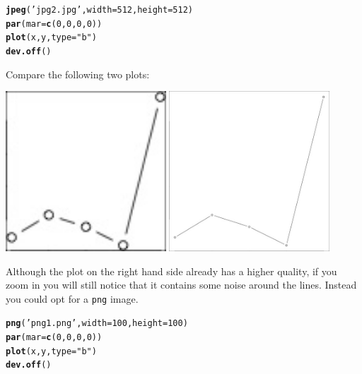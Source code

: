\documentclass{article}\usepackage[]{graphicx}\usepackage[]{color}
\makeatletter
\newcommand{\hlnum}[1]{\textcolor[rgb]{0.686,0.059,0.569}{#1}}%
\newcommand{\hlstr}[1]{\textcolor[rgb]{0.192,0.494,0.8}{#1}}%
\newcommand{\hlstd}[1]{\textcolor[rgb]{0.345,0.345,0.345}{#1}}%
\newcommand{\hlkwc}[1]{\textcolor[rgb]{0.333,0.667,0.333}{#1}}%
\newcommand{\hlkwd}[1]{\textcolor[rgb]{0.737,0.353,0.396}{\textbf{#1}}}%
\newenvironment{kframe}{%
 \def\at@end@of@kframe{}%
 \ifinner\ifhmode%
  \def\at@end@of@kframe{\end{minipage}}%
  \begin{minipage}{\columnwidth}%
 \fi\fi%
 \def\FrameCommand##1{\hskip\@totalleftmargin \hskip-\fboxsep
 \colorbox{shadecolor}{##1}\hskip-\fboxsep
     \hskip-\linewidth \hskip-\@totalleftmargin \hskip\columnwidth}%
 \MakeFramed {\advance\hsize-\width
   \@totalleftmargin\z@ \linewidth\hsize
   \@setminipage}}%
 {\par\unskip\endMakeFramed%
 \at@end@of@kframe}
\newenvironment{knitrout}{}{} %
\makeatother
\begin{document}
\begin{mdframed}
\begin{knitrout}
\begin{kframe}
\begin{alltt}
\hlkwd{jpeg}\hlstd{(}\hlstr{'jpg2.jpg'}\hlstd{,}\hlkwc{width}\hlstd{=}\hlnum{512}\hlstd{,}\hlkwc{height}\hlstd{=}\hlnum{512}\hlstd{)}
\hlkwd{par}\hlstd{(}\hlkwc{mar}\hlstd{=}\hlkwd{c}\hlstd{(}\hlnum{0}\hlstd{,}\hlnum{0}\hlstd{,}\hlnum{0}\hlstd{,}\hlnum{0}\hlstd{))}
\hlkwd{plot}\hlstd{(x,y,}\hlkwc{type}\hlstd{=}\hlstr{"b"}\hlstd{)}
\hlkwd{dev.off}\hlstd{()}
\end{alltt}
\end{kframe}
\end{knitrout}
Compare the following two plots:
\begin{center}
\includegraphics[width=0.45\textwidth]{jpg1.jpg}
\includegraphics[width=0.45\textwidth]{jpg2.jpg}
\end{center}
Although the plot on the right hand side already has a higher quality, if you zoom in you will still notice that it contains some noise around the lines. Instead you could opt for a \texttt{png} image.
\begin{knitrout}
\color{fgcolor}\begin{kframe}
\begin{alltt}
\hlkwd{png}\hlstd{(}\hlstr{'png1.png'}\hlstd{,}\hlkwc{width}\hlstd{=}\hlnum{100}\hlstd{,}\hlkwc{height}\hlstd{=}\hlnum{100}\hlstd{)}
\hlkwd{par}\hlstd{(}\hlkwc{mar}\hlstd{=}\hlkwd{c}\hlstd{(}\hlnum{0}\hlstd{,}\hlnum{0}\hlstd{,}\hlnum{0}\hlstd{,}\hlnum{0}\hlstd{))}
\hlkwd{plot}\hlstd{(x,y,}\hlkwc{type}\hlstd{=}\hlstr{"b"}\hlstd{)}
\hlkwd{dev.off}\hlstd{()}


\end{alltt}
\end{kframe}
\end{knitrout}
\end{mdframed}
\end{document}
